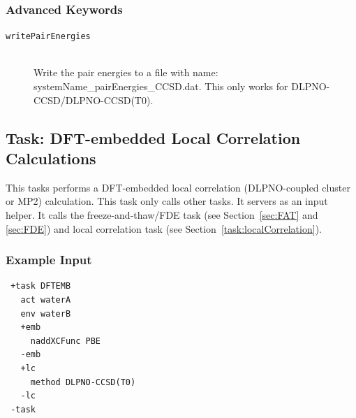 \documentclass[bibliography=totocnumbered,a4paper,10pt,oneside]{scrbook}
\begin{document}
\subsubsection{Advanced Keywords}
\begin{description}
  \item [\texttt{writePairEnergies}]\hfill \\
  Write the pair energies to a file with name: systemName\_pairEnergies\_CCSD.dat. This only works for
  DLPNO-CCSD/DLPNO-CCSD(T0).
\end{description}

\subsection{Task: DFT-embedded Local Correlation Calculations}
This tasks performs a DFT-embedded local correlation (DLPNO-coupled cluster or MP2) calculation.
This task only calls other tasks. It servers as an input helper. It calls the freeze-and-thaw/FDE task
(see Section~\ref{sec:FAT} and \ref{sec:FDE}) and local correlation task
(see Section~\ref{task:localCorrelation}).
\subsubsection{Example Input}
\begin{lstlisting}
 +task DFTEMB
   act waterA
   env waterB
   +emb
     naddXCFunc PBE
   -emb
   +lc
     method DLPNO-CCSD(T0)
   -lc
 -task
\end{lstlisting}
\end{document}

